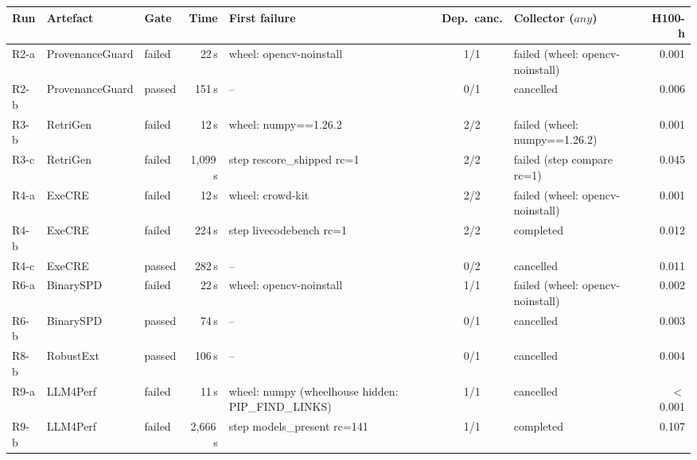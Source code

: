 \begin{tabularx}{\textwidth}{@{}l l l r >{\raggedright\arraybackslash}X c >{\raggedright\arraybackslash}p{3.4cm} r@{}}
\toprule
Run & Artefact & Gate & Time & First failure & Dep.\ canc. & Collector ($\mathit{any}$) & H100-h \\
\midrule
R2-a & ProvenanceGuard & failed & 22\,s & wheel: opencv-noinstall & 1/1 & failed (wheel: opencv-noinstall) & 0.001 \\
R2-b & ProvenanceGuard & passed & 151\,s & -- & 0/1 & cancelled & 0.006 \\
R3-b & RetriGen & failed & 12\,s & wheel: numpy==1.26.2 & 2/2 & failed (wheel: numpy==1.26.2) & 0.001 \\
R3-c & RetriGen & failed & 1{,}099\,s & step rescore\_shipped rc=1 & 2/2 & failed (step compare rc=1) & 0.045 \\
R4-a & ExeCRE & failed & 12\,s & wheel: crowd-kit & 2/2 & failed (wheel: opencv-noinstall) & 0.001 \\
R4-b & ExeCRE & failed & 224\,s & step livecodebench rc=1 & 2/2 & completed & 0.012 \\
R4-c & ExeCRE & passed & 282\,s & -- & 0/2 & cancelled & 0.011 \\
R6-a & BinarySPD & failed & 22\,s & wheel: opencv-noinstall & 1/1 & failed (wheel: opencv-noinstall) & 0.002 \\
R6-b & BinarySPD & passed & 74\,s & -- & 0/1 & cancelled & 0.003 \\
R8-b & RobustExt & passed & 106\,s & -- & 0/1 & cancelled & 0.004 \\
R9-a & LLM4Perf & failed & 11\,s & wheel: numpy (wheelhouse hidden: PIP\_FIND\_LINKS) & 1/1 & cancelled & $<$0.001 \\
R9-b & LLM4Perf & failed & 2{,}666\,s & step models\_present rc=141 & 1/1 & completed & 0.107 \\
\bottomrule
\end{tabularx}
